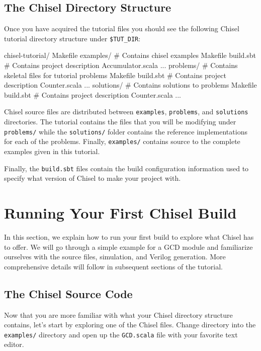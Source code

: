\subsection{The Chisel Directory Structure}

Once you have acquired the tutorial files you should see the following Chisel tutorial directory structure under \verb+$TUT_DIR+:

\begin{bash}
chisel-tutorial/  
  Makefile
  examples/   # Contains chisel examples
    Makefile  
    build.sbt # Contains project description
    Accumulator.scala ...
  problems/   # Contains skeletal files for tutorial problems
    Makefile
    build.sbt # Contains project description
    Counter.scala ...
  solutions/  # Contains solutions to problems
    Makefile
    build.sbt # Contains project description
    Counter.scala ...
\end{bash}

Chisel source files are distributed between \verb+examples+, \verb+problems+, and \verb+solutions+ directories.
The tutorial contains the files that you will be modifying under \verb+problems/+ while the \verb+solutions/+ folder contains the reference implementations for each of the problems.  Finally, \verb+examples/+ contains source to the complete examples given in this tutorial.

Finally, the \verb+build.sbt+ files contain the build configuration information used to specify what version of Chisel to make your project with.

\section{Running Your First Chisel Build}

In this section, we explain how to run your first build to explore what Chisel has to offer. We will go through a simple example for a GCD module and familiarize ourselves with the source files, simulation, and Verilog generation. More comprehensive details will follow in subsequent sections of the tutorial.

\subsection{The Chisel Source Code}

Now that you are more familiar with what your Chisel directory structure contains, let's start by exploring one of the Chisel files. Change directory into the \verb+examples/+ directory and open up the \verb+GCD.scala+ file with your favorite text editor. 

